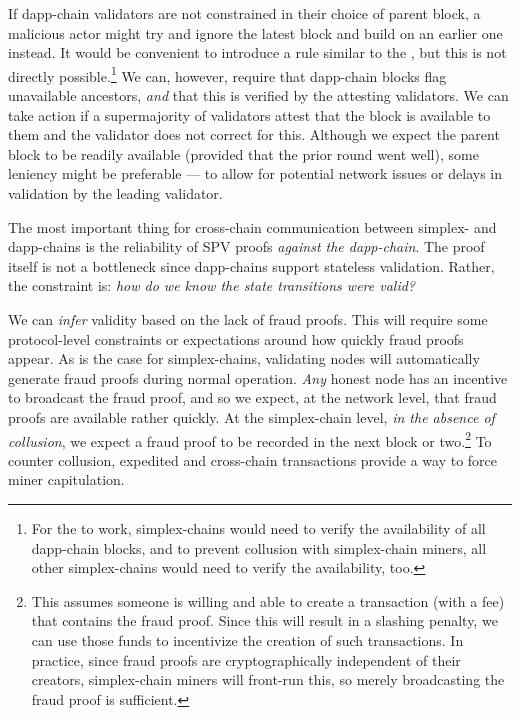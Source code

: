 If dapp-chain validators are not constrained in their choice of parent block, a malicious actor might try and ignore the latest block and build on an earlier one instead.
It would be convenient to introduce a rule similar to the \AxiomOfUnifiedAncestry{}, but this is not directly possible.\footnote{
    For the \AxiomOfUnifiedAncestry{} to work, simplex-chains would need to verify the availability of all dapp-chain blocks, and to prevent collusion with simplex-chain miners, all other simplex-chains would need to verify the availability, too.
}
We can, however, require that dapp-chain blocks flag unavailable ancestors, \emph{and} that this is verified by the attesting validators.
We can take action if a supermajority of validators attest that the block is available to them and the validator does not correct for this.
Although we expect the parent block to be readily available (provided that the prior round went well), some leniency might be preferable --- to allow for potential network issues or delays in validation by the leading validator.


The most important thing for cross-chain communication between simplex- and dapp-chains is the reliability of SPV proofs \emph{against the dapp-chain}.
The proof itself is not a bottleneck since dapp-chains support stateless validation.
Rather, the constraint is: \emph{how do we know the state transitions were valid?}



We can \emph{infer} validity based on the lack of fraud proofs.
This will require some protocol-level constraints or expectations around how quickly fraud proofs appear.
As is the case for simplex-chains, validating nodes will automatically generate fraud proofs during normal operation.
\emph{Any} honest node has an incentive to broadcast the fraud proof, and so we expect, at the network level, that fraud proofs are available rather quickly.
At the simplex-chain level, \emph{in the absence of collusion}, we expect a fraud proof to be recorded in the next block or two.\footnote{
    This assumes someone is willing and able to create a transaction (with a fee) that contains the fraud proof.
    Since this will result in a slashing penalty, we can use those funds to incentivize the creation of such transactions.
    In practice, since fraud proofs are cryptographically independent of their creators, simplex-chain miners will front-run this, so merely broadcasting the fraud proof is sufficient.
}
To counter collusion, expedited and cross-chain transactions provide a way to force miner capitulation.

